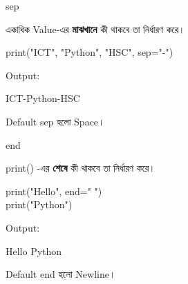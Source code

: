 \noindent
\begin{minipage}[t]{0.49\linewidth}

\begin{examplebox}{\textenglish{\ttfamily sep}}

একাধিক Value-এর \textbf{মাঝখানে} কী থাকবে তা নির্ধারণ করে।

\begin{codebox}
\begin{english}
\ttfamily
print("ICT", "Python", "HSC", sep="-")
\end{english}
\end{codebox}

Output:
\begin{codebox}
\begin{english}
\ttfamily
ICT-Python-HSC
\end{english}
\end{codebox}

Default
\textenglish{\ttfamily sep}
হলো Space।

\end{examplebox}

\end{minipage}
\hfill
\begin{minipage}[t]{0.49\linewidth}

\begin{examplebox}{\textenglish{\ttfamily end}}

\textenglish{\ttfamily print()}
-এর \textbf{শেষে} কী থাকবে তা নির্ধারণ করে।

\begin{codebox}
\begin{english}
\ttfamily
print("Hello", end=" ")\\
print("Python")
\end{english}
\end{codebox}

Output:
\begin{codebox}
\begin{english}
\ttfamily
Hello Python
\end{english}
\end{codebox}

Default
\textenglish{\ttfamily end}
হলো Newline।

\end{examplebox}

\end{minipage}

